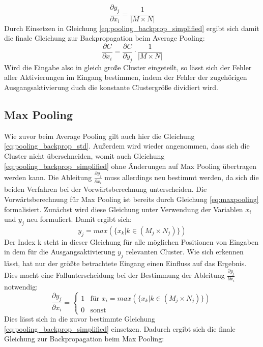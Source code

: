 \documentclass[../main.tex]{subfiles}
\begin{document}
\begin{equation}
\frac{\partial y_j}{\partial x_i} = \frac{1}{|M\times{N}|}
\end{equation}
Durch Einsetzen in Gleichung \ref{eq:pooling_backprop_simplified} ergibt sich damit die finale Gleichung zur Backpropagation beim Average Pooling: 
\begin{equation} \label{eq:pooling_backprop_avg_final}
\frac{\partial C}{\partial x_i} = \frac{\partial C}{\partial y_j} \cdot \frac{1}{|M\times{N}|}
\end{equation}
Wird die Eingabe also in gleich große Cluster eingeteilt, so lässt sich der Fehler aller Aktivierungen im Eingang bestimmen, indem der Fehler der zugehörigen Ausgangsaktivierung duch die konstante Clustergröße dividiert wird. 

\subsection{Max Pooling}
Wie zuvor beim Average Pooling gilt auch hier die Gleichung \ref{eq:pooling_backprop_std}. Außerdem wird wieder angenommen, dass sich die Cluster nicht überschneiden, womit auch Gleichung \ref{eq:pooling_backprop_simplified} ohne Änderungen auf Max Pooling übertragen werden kann. Die Ableitung \(\frac{\partial y_j}{\partial x_i}\) muss allerdings neu bestimmt werden, da sich die beiden Verfahren bei der Vorwärtsberechnung unterscheiden. 
Die Vorwärtsberechnung für Max Pooling ist bereits durch Gleichung \ref{eq:maxpooling} formalisiert. Zunächst wird diese Gleichung unter Verwendung der Variablen \(x_i\) und \(y_j\) neu formuliert. Damit ergibt sich: 
\begin{equation}
y_j = max( \{x_k | k \in (M_j \times N_j)\})
\end{equation}
Der Index k steht in dieser Gleichung für alle möglichen Positionen von Eingaben in dem für die Ausgangsaktivierung \(y_j\) relevanten Cluster. Wie sich erkennen lässt, hat nur der größte betrachtete Eingang einen Einfluss auf das Ergebnis. Dies macht eine Fallunterscheidung bei der Bestimmung der Ableitung \(\frac{\partial y_j}{\partial x_i}\) notwendig: 
\begin{equation}
   \frac{\partial y_j}{\partial x_i} = 
   \begin{cases}
     1 & \text{für } x_i = max( \{x_k | k \in (M_j \times N_j)\}) \\
     0 & \text{sonst}
   \end{cases}
\end{equation}
Dies lässt sich in die zuvor bestimmte Gleichung \ref{eq:pooling_backprop_simplified} einsetzen. Dadurch ergibt sich die finale Gleichung zur Backpropagation beim Max Pooling: 
\end{document}
